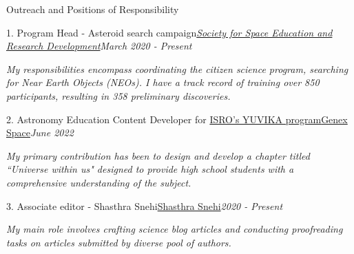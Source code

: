 \begin{section}{Outreach and Positions of Responsibility}

    \begin{subsectionnobullet}{1. Program Head - Asteroid search campaign}{\href{https://www.sserd.org/asteroidhunt/}{\textit{Society for Space Education and Research Development}}}{\textit{March 2020 - Present}}{}

        \item \textit{{My responsibilities encompass coordinating the citizen science program, searching for Near Earth Objects (NEOs). I have a track record of training over 850 participants, resulting in 358 preliminary discoveries.}}

    \end{subsectionnobullet}

  \vspace{-0.2em}  

    \begin{subsectionnobullet}{2. Astronomy Education Content Developer for \href{https://www.isro.gov.in/YUVIKA.html}{ISRO's YUVIKA program}}{\href{https://genex.space/}{Genex Space}}{\textit{June 2022}}{}
        \item \textit{{My primary contribution has been to design and develop a chapter titled ``Universe within us" designed to provide high school students with a comprehensive understanding of the subject.}}
    \end{subsectionnobullet} 

    \vspace{-0.2em}

    \begin{subsectionnobullet}{3. Associate editor - Shasthra Snehi}{\href{https://shasthrasnehi.com/}{Shasthra Snehi}}{\textit{2020 - Present}}{}
    \item \textit{{My main role involves crafting science blog articles and conducting proofreading tasks on articles submitted by diverse pool of authors.}}
    \end{subsectionnobullet}

\end{section}